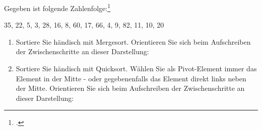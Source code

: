 \documentclass{bschlangaul-aufgabe}
\begin{document}

Gegeben ist folgende Zahlenfolge:\footcite[entnommen aus Algorithmen und
Datenstrukturen, Übungsblatt 2, Universität Würzburg, Aufgabe 3]{aud:pu:7}

35, 22, 5, 3, 28, 16, 8, 60, 17, 66, 4, 9, 82, 11, 10, 20

\begin{enumerate}
\item Sortiere Sie händisch mit Mergesort. Orientieren
Sie sich beim Aufschreiben der Zwischenschritte an dieser Darstellung:

\item Sortiere Sie händisch mit Quicksort. Wählen Sie
als Pivot-Element immer das Element in der Mitte - oder gegebenenfalls
das Element direkt links neben der Mitte. Orientieren Sie sich beim
Aufschreiben der Zwischenschritte an dieser Darstellung:
\end{enumerate}
\end{document}
